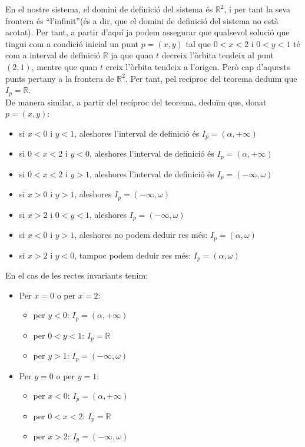 \documentclass[10pt,a4paper]{article}
\newcommand{\R}{\mathbb R}
\begin{document}
En el nostre sistema, el domini de definició del sistema és $\R^2$, i per tant la seva frontera és \textquotedblleft l'infinit\textquotedblright (és a dir, que el domini de definició del sistema no està acotat). Per tant, a partir d'aquí ja podem assegurar que qualsevol solució que tingui com a condició inicial un punt $p=(x,y)$ tal que $0<x<2$ i $0<y<1$ té com a interval de definició $\R$ ja que quan $t$ decreix l'òrbita tendeix al punt $(2,1)$, mentre que quan $t$ creix l'òrbita tendeix a l'origen. Però cap d'aquests punts pertany a la frontera de $\R^2$. Per tant, pel recíproc del teorema deduïm que $I_p=\R$.
\\
De manera similar, a partir del recíproc del teorema, deduïm que, donat $p=(x,y)$:
\begin{itemize}
  \item si $x<0$ i $y<1$, aleshores l'interval de definició és $I_p=(\alpha, +\infty)$
  \item si $0<x<2$ i $y<0$, aleshores l'interval de definició és $I_p=(\alpha, +\infty)$
  \item si $0<x<2$ i $y>1$, aleshores l'interval de definició és $I_p=(-\infty, \omega)$
  \item si $x>0$ i $y>1$, aleshores $I_p=(-\infty, \omega)$
  \item si $x>2$ i $0<y<1$, aleshores $I_p=(-\infty, \omega)$
  \item si $x<0$ i $y>1$, aleshores no podem deduir res més: $I_p=(\alpha, \omega)$
  \item si $x>2$ i $y<0$, tampoc podem deduir res més: $I_p=(\alpha, \omega)$
\end{itemize}

En el cas de les rectes invariants tenim:
\begin{itemize}
  \item Per $x=0$ o per $x=2$:
        \begin{itemize}
          \item per $y<0$: $I_p=(\alpha, +\infty)$
          \item per $0<y<1$: $I_p=\R$
          \item per $y>1$: $I_p=(-\infty, \omega)$
        \end{itemize}
  \item Per $y=0$ o per $y=1$:
        \begin{itemize}
          \item per $x<0$: $I_p=(\alpha, +\infty)$
          \item per $0<x<2$: $I_p=\R$
          \item per $x>2$: $I_p=(-\infty, \omega)$
        \end{itemize}
\end{itemize}
\end{document}

